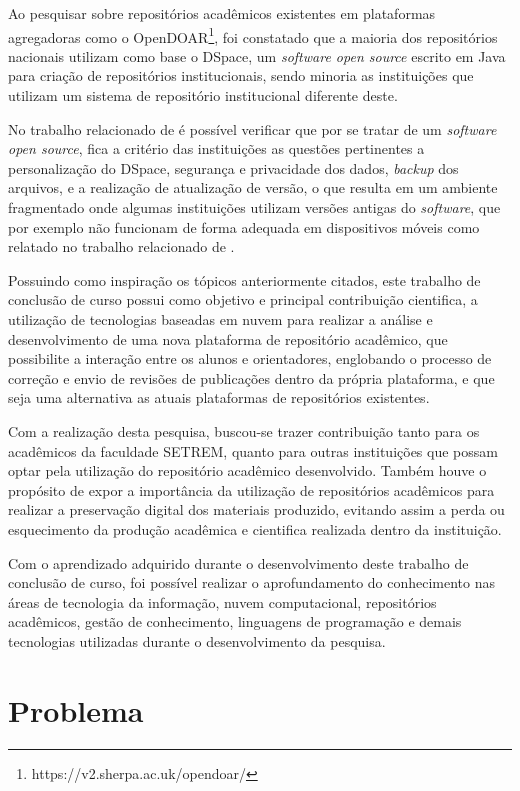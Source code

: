 Ao pesquisar sobre repositórios acadêmicos existentes em plataformas
agregadoras como o OpenDOAR\footnote{https://v2.sherpa.ac.uk/opendoar/},
foi constatado que a maioria dos repositórios nacionais utilizam como
base o DSpace, um \emph{software open source} escrito em Java para
criação de repositórios institucionais, sendo minoria as instituições
que utilizam um sistema de repositório institucional diferente deste.

No trabalho relacionado de \cite{2019:RodrigoMoreira} é possível
verificar que por se tratar de um \emph{software open source},
fica a critério das instituições as questões pertinentes a personalização
do DSpace, segurança e privacidade dos dados, \emph{backup} dos arquivos,
e a realização de atualização de versão, o que resulta em um ambiente
fragmentado onde algumas instituições utilizam versões antigas do \emph{software},
que por exemplo não funcionam de forma adequada em dispositivos móveis como
relatado no trabalho relacionado de \cite{2019:FernandesMacedes}.

Possuindo como inspiração os tópicos anteriormente citados,
este trabalho de conclusão de curso possui como objetivo e principal
contribuição cientifica, a utilização de tecnologias baseadas em
nuvem para realizar a análise e desenvolvimento de uma nova plataforma
de repositório acadêmico, que possibilite a interação entre os alunos
e orientadores, englobando o processo de correção e envio de revisões
de publicações dentro da própria plataforma, e que seja uma alternativa
as atuais plataformas de repositórios existentes.

Com a realização desta pesquisa, buscou-se trazer contribuição
tanto para os acadêmicos da faculdade SETREM, quanto para outras
instituições que possam optar pela utilização do repositório
acadêmico desenvolvido. Também houve o propósito de expor a
importância da utilização de repositórios acadêmicos para realizar
a preservação digital dos materiais produzido, evitando assim a perda
ou esquecimento da produção acadêmica e cientifica realizada dentro
da instituição.

Com o aprendizado adquirido durante o desenvolvimento deste trabalho
de conclusão de curso, foi possível realizar o aprofundamento do
conhecimento nas áreas de tecnologia da informação, nuvem computacional,
repositórios acadêmicos, gestão de conhecimento, linguagens de programação
e demais tecnologias utilizadas durante o desenvolvimento da pesquisa.

\section{Problema} \label{sec::Problem}

